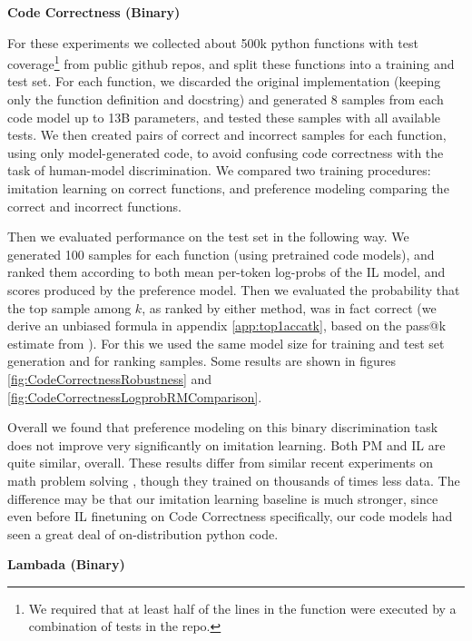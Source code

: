 {\bf Code Correctness (Binary)}

For these experiments we collected about 500k python functions with test coverage\footnote{We required that at least half of the lines in the function were executed by a combination of tests in the repo.}  from public github repos, and split these functions into a training and test set.  For each function, we discarded the original implementation (keeping only the function definition and docstring) and generated 8 samples from each code model up to 13B parameters, and tested these samples with all available tests.  We then created pairs of correct and incorrect samples for each function, using only model-generated code, to avoid confusing  code correctness with the task of  human-model discrimination.  We compared two training procedures: imitation learning on correct functions, and preference modeling comparing the correct and incorrect functions. 

Then we evaluated performance on the test set in the following way.  We generated 100 samples for each function (using pretrained code models), and ranked them according to both mean per-token log-probs of the IL model, and  scores produced by the preference model.  Then we evaluated the probability that the top sample among $k$, as ranked by either method, was in fact correct (we derive an unbiased formula in appendix \ref{app:top1accatk}, based on the pass@k estimate from \cite{chen2021evaluating}).  For this we used the same model size for training and test set generation and for ranking samples.  Some results are shown in figures \ref{fig:CodeCorrectnessRobustness} and \ref{fig:CodeCorrectnessLogprobRMComparison}.

Overall we found that preference modeling on this binary discrimination task does not improve very significantly on imitation learning.  Both PM and IL are quite similar, overall.  These results differ from  similar recent experiments on math problem solving \cite{cobbe2021training}, though they trained on thousands of times less data.  The difference may be that our imitation learning baseline is much stronger, since even before IL finetuning on Code Correctness specifically, our code models had seen a great deal of on-distribution python code.  

{\bf Lambada (Binary)}

